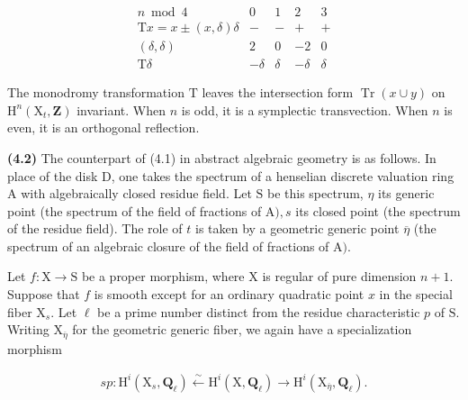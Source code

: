 \documentclass[10pt,leqno]{article}
\begin{document}
\[\begin{array}{crrrr}n\bmod4&0&1&2&3\\ \mathrm Tx=x\pm(x,\delta)\delta&-&-&+&+\\ (\delta,\delta)&2&0&-2&0\\ \mathrm T\delta&-\delta&\delta&-\delta&\delta\end{array}\]

\clearpage

\label{physical-17}

\noindent The monodromy transformation \(\mathrm{T}\) leaves the intersection form \(\operatorname{Tr}(x\cup y)\) on \(\mathrm{H}^{n}(\mathrm{X}_{t},\mathbf{Z})\) invariant. When \(n\) is odd, it is a symplectic transvection. When \(n\) is even, it is an orthogonal reflection.\par

\noindent \textbf{(4.2)} The counterpart of (4.1) in abstract algebraic geometry is as follows. In place of the disk \(\mathrm{D}\), one takes the spectrum of a henselian discrete valuation ring \(\mathrm{A}\) with algebraically closed residue field. Let \(\mathrm{S}\) be this spectrum, \(\eta \) its generic point (the spectrum of the field of fractions of \(\mathrm{A}), s\) its closed point (the spectrum of the residue field). The role of \(t\) is taken by a geometric generic point \(\overline{\eta }\) (the spectrum of an algebraic closure of the field of fractions of \(\mathrm{A})\).\par

\noindent Let \(f : \mathrm{X}\longrightarrow \mathrm{S}\) be a proper morphism, where \(\mathrm{X}\) is regular of pure dimension \(n+1\). Suppose that \(f\) is smooth except for an ordinary quadratic point \(x\) in the special fiber \(\mathrm{X}_{s}\). Let \(\ell \) be a prime number distinct from the residue characteristic \(p\) of \(\mathrm{S}\). Writing \(\mathrm{X}_{\overline{\eta }}\) for the geometric generic fiber, we again have a specialization morphism\par

\begin{equation*}\begin{gathered}\mathit{sp} : \mathrm{H}^{i}(\mathrm{X}_{s},\mathbf{Q}_{\ell }) \xleftarrow{\sim } \mathrm{H}^{i}(\mathrm{X},\mathbf{Q}_{\ell }) \longrightarrow  \mathrm{H}^{i}(\mathrm{X}_{\overline{\eta }},\mathbf{Q}_{\ell }).\end{gathered}\tag{4.2.1}\end{equation*}
\end{document}
